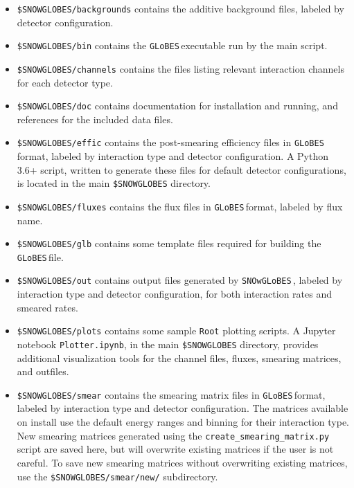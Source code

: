 \documentclass{article}
\newcommand{\snow}{\texttt{SNOwGLoBES}\,}
\newcommand{\glb}{\texttt{GLoBES}\,}
\begin{document}
\begin{itemize}

\item \texttt{\$SNOWGLOBES/backgrounds} contains the additive background files, labeled by detector configuration.

\item \texttt{\$SNOWGLOBES/bin} contains the \glb executable run by the main script.

\item \texttt{\$SNOWGLOBES/channels} contains the files listing relevant interaction channels for each detector type.

\item \texttt{\$SNOWGLOBES/doc} contains documentation for installation and running, and references for the included data files. 

\item \texttt{\$SNOWGLOBES/effic} contains the post-smearing efficiency files in \glb format, labeled by interaction type and detector configuration. A Python 3.6+ script, written to generate these files for default detector configurations, is located in the main \texttt{\$SNOWGLOBES} directory.

\item \texttt{\$SNOWGLOBES/fluxes} contains the flux files in \glb format, labeled by flux name.

\item \texttt{\$SNOWGLOBES/glb} contains some template files required for building the \glb file.

\item \texttt{\$SNOWGLOBES/out} contains output files generated by \snow, labeled by interaction type and detector configuration, for both interaction rates and smeared rates.

\item \texttt{\$SNOWGLOBES/plots} contains some sample \texttt{Root} plotting scripts. A Jupyter notebook \texttt{Plotter.ipynb}, in the main \texttt{\$SNOWGLOBES} directory, provides additional visualization tools for the channel files, fluxes, smearing matrices, and outfiles.

\item \texttt{\$SNOWGLOBES/smear} contains the smearing matrix files in \glb format, labeled by interaction type and detector configuration. The matrices available on install use the default energy ranges and binning for their interaction type. New smearing matrices generated using the \texttt{create\_smearing\_matrix.py} script are saved here, but will overwrite existing matrices if the user is not careful. To save new smearing matrices without overwriting existing matrices, use the \texttt{\$SNOWGLOBES/smear/new/} subdirectory.


\end{itemize}
\end{document}
